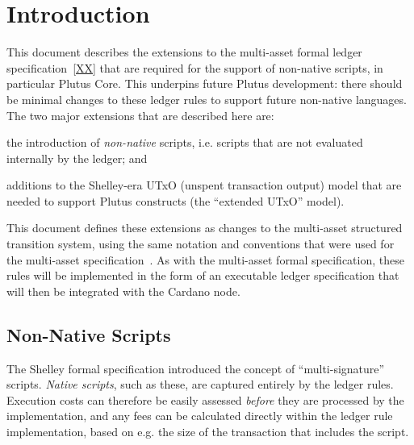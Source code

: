 \section{Introduction}


This document describes the extensions to the multi-asset formal ledger specification~\ref{XX}  that are
required for the support of non-native scripts, in particular Plutus Core. This underpins future Plutus development: there should be minimal changes to these ledger rules to support future non-native languages.
%
The two major extensions that are described here are:
\begin{inparaenum}
\item
the introduction
of \emph{non-native} scripts, i.e. scripts that are not evaluated internally by the ledger; and
\item
  additions to the Shelley-era UTxO (unspent transaction output) model that are needed to support Plutus
  constructs (the ``extended UTxO'' model).
\end{inparaenum}
This document defines these extensions as changes to the multi-asset structured transition system,
using the same notation and conventions that were used for the multi-asset specification~\cite{XX}.
As with the multi-asset formal specification, these rules will be implemented in the form of an executable ledger specification that will then be
integrated with the Cardano node.

\subsection{Non-Native Scripts}

The Shelley formal specification introduced the concept of ``multi-signature'' scripts.
\emph{Native scripts}, such as these, are captured entirely by the ledger rules.
Execution costs can therefore be easily assessed \emph{before} they are processed by the implementation,
and any fees can be calculated directly within the ledger rule implementation,
based on e.g. the size of the transaction that includes the script.

